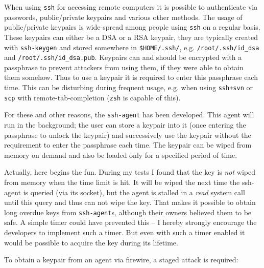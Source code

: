 When using \texttt{ssh} for accessing remote computers it is possible to
authenticate via passwords, public/private keypairs and various other methods.
The usage of public/private keypairs is wide-spread among people using
\texttt{ssh} on a regular basis. These keypairs can either be a DSA or a RSA
keypair, they are typically created with \texttt{ssh-keygen} and stored
somewhere in \texttt{\$HOME/.ssh/}, e.g.  \texttt{/root/.ssh/id\_dsa} and
\texttt{/root/.ssh/id\_dsa.pub}. Keypairs can and should be encrypted with a
passphrase to prevent attackers from using them, if they were able to obtain
them somehow. Thus to use a keypair it is required to enter this passphrase each
time. This can be disturbing during frequent usage, e.g. when using
\texttt{ssh+svn} or \texttt{scp} with remote-tab-completion (\texttt{zsh} is
capable of this).

For these and other reasons, the \texttt{ssh-agent} has been developed. This
agent will run in the background; the user can store a keypair into it (once
entering the passphrase to unlock the keypair) and successively use the keypair
without the requirement to enter the passphrase each time. The keypair can be
wiped from memory on demand and also be loaded only for a specified period of
time.

Actually, here begins the fun. During my tests I found that the key is
\emph{not} wiped from memory when the time limit is hit. It will be wiped the
next time the ssh-agent is queried (via its socket), but the agent is stalled in
a \emph{read} system call until this query and thus can not wipe the key. That
makes it possible to obtain long overdue keys from \texttt{ssh-agent}s, although
their owners believed them to be safe. A simple timer could have prevented this
-- I hereby strongly encourage the developers to implement such a timer. But
even with such a timer enabled it would be possible to acquire the key during
its lifetime.

To obtain a keypair from an agent via firewire, a staged attack is required:

